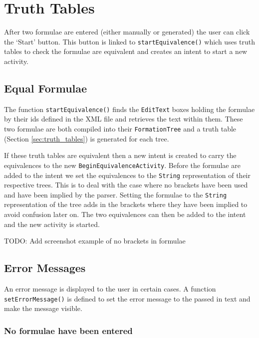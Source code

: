 \documentclass{report}
\begin{document}
\section{Truth Tables}
\label{sec:app_truth_tables}

After two formulae are entered (either manually or generated) the user can click the `Start' button. This button is linked to {\tt startEquivalence()} which uses truth tables to check the formulae are equivalent and creates an intent to start a new activity.

\subsection{Equal Formulae}
\label{sub:equal_equivalences}

The function {\tt startEquivalence()} finds the {\tt EditText} boxes holding the formulae by their ids defined in the XML file and retrieves the text within them. These two formulae are both compiled into their {\tt FormationTree} and a truth table (Section \ref{sec:truth_tables}) is generated for each tree. 

If these truth tables are equivalent then a new intent is created to carry the equivalences to the new {\tt BeginEquivalenceActivity}. Before the formulae are added to the intent we set the equivalences to the {\tt String} representation of their respective trees. This is to deal with the case where no brackets have been used and have been implied by the parser. Setting the formulae to the {\tt String} representation of the tree adds in the brackets where they have been implied to avoid confusion later on. The two equivalences can then be added to the intent and the new activity is started.

TODO: Add screenshot example of no brackets in formulae

\subsection{Error Messages}
\label{sub:error_messages}

An error message is displayed to the user in certain cases. A function {\tt setErrorMessage()} is defined to set the error message to the passed in text and make the message visible.


\subsubsection{No formulae have been entered}
\end{document}
